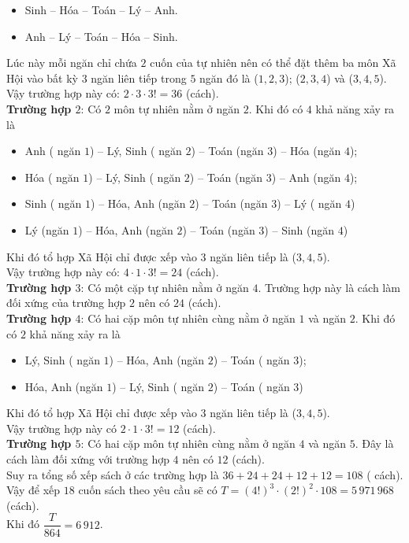 \begin{ex}
{		\begin{itemize}
			\item Sinh -- Hóa -- Toán -- Lý -- Anh.
			\item Anh -- Lý -- Toán -- Hóa -- Sinh.
		\end{itemize}
		Lúc này mỗi ngăn chỉ chứa $2$ cuốn của tự nhiên nên có thể đặt thêm ba môn Xã Hội vào bất kỳ $3$ ngăn liên tiếp trong $5$ ngăn đó là ($1,2,3$); ($2,3,4$) và ($3,4,5$).\\
		Vậy trường hợp này có: $2\cdot  3\cdot  3!=36$ (cách).\\
		\textbf{Trường hợp $2$}: Có $2$ môn tự nhiên nằm ở ngăn $2$. Khi đó có $4$ khả năng xảy ra là
		\begin{itemize}
			\item Anh ( ngăn $1$) -- Lý, Sinh ( ngăn $2$) -- Toán (ngăn $3$) -- Hóa (ngăn $4$);
			\item Hóa ( ngăn $1$) -- Lý, Sinh ( ngăn $2$) -- Toán (ngăn $3$) -- Anh (ngăn $4$);
			\item Sinh ( ngăn $1$) -- Hóa, Anh (ngăn $2$) -- Toán (ngăn $3$) -- Lý ( ngăn $4$)
			\item Lý (ngăn $1$) -- Hóa, Anh (ngăn $2$) -- Toán (ngăn $3$) -- Sinh (ngăn $4$)
		\end{itemize}
		Khi đó tổ hợp Xã Hội chỉ được xếp vào $3$ ngăn liên tiếp là ($3,4,5$).\\
		Vậy trường hợp này có: $4\cdot  1\cdot  3!=24$ (cách).\\
		\textbf{Trường hợp $3$}: Có một cặp tự nhiên nằm ở ngăn $4$. Trường hợp này là cách làm đối xứng của trường hợp $2$ nên có $24$ (cách).\\
		\textbf{Trường hợp $4$}: Có hai cặp môn tự nhiên cùng nằm ở ngăn $1$ và ngăn $2$. Khi đó có $2$ khả năng xảy ra là
		\begin{itemize}
			\item Lý, Sinh ( ngăn $1$) -- Hóa, Anh (ngăn $2$) -- Toán ( ngăn $3$);
			\item Hóa, Anh (ngăn $1$) -- Lý, Sinh ( ngăn $2$) -- Toán ( ngăn $3$)
		\end{itemize}
		Khi đó tổ hợp Xã Hội chỉ được xếp vào $3$ ngăn liên tiếp là ($3,4,5$).\\
		Vậy trường hợp này có $2\cdot  1\cdot  3!=12$ (cách).\\
		\textbf{Trường hợp $5$}: Có hai cặp môn tự nhiên cùng nằm ở ngăn $4$ và ngăn $5$. Đây là cách làm đối xứng với trường hợp $4$ nên có $12$ (cách).\\
		Suy ra tổng số xếp sách ở các trường hợp là $36+24+24+12+12=108$ ( cách).\\
		Vậy để xếp $18$ cuốn sách theo yêu cầu sẽ có $T=(4!)^3 \cdot  (2!)^2 \cdot  108=5\,971\,968$ (cách).\\
		Khi đó $\dfrac{T}{864} =6\,912$.}
\end{ex}

